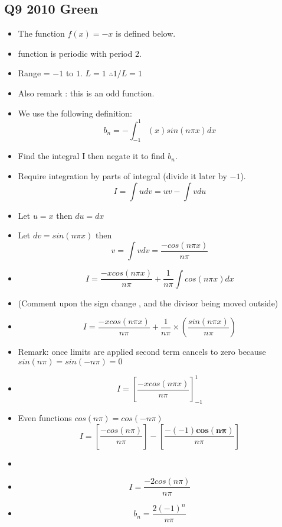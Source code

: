 \documentclass[11pt,a4paper,titlepage,oneside,openany]{article}
\numberwithin{equation}{section}
\numberwithin{algorithm}{section}
\numberwithin{figure}{section}
\numberwithin{table}{section}
\begin{document}
\subsection*{Q9 2010 Green}
\begin{itemize}
\item The function $f(x) = -x$  is defined below.

\item function is periodic with period $2$.
\item Range = $-1$ to $1$. $L=1$ $\therefore 1/L = 1$
\item Also remark : this is an odd function.
\item We use the following definition: \[ b_n = - \int^{1}_{-1} (x) sin(n\pi x) dx \]
\item Find the integral I then negate it to find $b_n$.
\item Require integration by parts of integral (divide it later by $-1$).
\[ I =\int u dv = uv - \int vdu \]
\item Let $u = x$ then $du = dx$
\item Let $dv = sin(n\pi x)$ then
\[ v = \int v dv = \frac{-cos(n\pi x)}{n\pi }  \]

\item \[ I = \frac{-xcos(n\pi x)}{n\pi } + \frac{1}{n\pi} \int cos(n\pi x) dx \]
\item (Comment upon the sign change , and the divisor being moved outside)
\item \[ I = \frac{-xcos(n\pi x)}{n\pi } + \frac{1}{n\pi } \times \left(\frac{sin(n\pi x)}{n\pi }\right) \]
\item Remark: once limits are applied second term cancels to zero because $sin(n\pi) = sin(-n\pi) = 0 $
\item \[ I = \left[ \frac{-xcos(n\pi x)}{n\pi }  \right]^{1}_{-1} \]

\item Even functions $cos(n\pi) = cos(-n\pi) $ \[ I = \left[ \frac{-cos(n\pi)}{n\pi }  \right] - \left[ \frac{-(-1)\boldsymbol{cos(n\pi)}}{n\pi }  \right] \]



\item 
\item \[ I =  \frac{-2 cos(n \pi)}{n\pi} \]
\item \[b_n = \frac{2 (-1)^n}{n\pi}\]
\end{itemize}
\newpage
\end{document}

